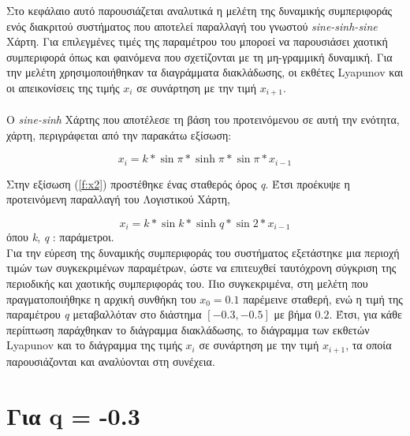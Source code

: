Στο κεφάλαιο αυτό παρουσιάζεται αναλυτικά η μελέτη της δυναμικής συμπεριφοράς ενός διακριτού συστήματος που αποτελεί παραλλαγή του γνωστού \emph{sine-sinh-sine} Χάρτη. Για επιλεγμένες τιμές της παραμέτρου του μποροεί να παρουσιάσει χαοτική συμπεριφορά όπως και φαινόμενα που σχετίζονται με τη μη-γραμμική δυναμική. Για την μελέτη χρησιμοποιήθηκαν τα διαγράμματα διακλάδωσης, οι εκθέτες Lyapunov και οι απεικονίσεις της τιμής \(x_i\) σε συνάρτηση με  την τιμή \(x_{i+1}\).\\\\

Ο \emph{sine-sinh} Χάρτης που αποτέλεσε τη βάση του προτεινόμενου σε αυτή την ενότητα, χάρτη, περιγράφεται από την παρακάτω εξίσωση:

\begin{equation}
	x_i=k*\sin{\pi*\sinh{\pi*\sin{\pi* x_{i-1}}}}
	\label{f:x2}
\end{equation}


Στην εξίσωση (\ref{f:x2}) προστέθηκε ένας σταθερός όρος \emph{q}. Έτσι προέκυψε η προτεινόμενη παραλλαγή του Λογιστικού Χάρτη,

\begin{equation}
	x_i=k*\sin{k*\sinh{q*\sin{2 * x_{i-1}}}}
	\label{f:x3}
\end{equation}
όπου \emph{k}, \emph{q} : παράμετροι.\\

Για την εύρεση της δυναμικής συμπεριφοράς του συστήματος εξετάστηκε μια περιοχή τιμών των συγκεκριμένων παραμέτρων, ώστε να επιτευχθεί ταυτόχρονη σύγκριση της περιοδικής και χαοτικής συμπεριφοράς του. Πιο συγκεκριμένα, στη μελέτη που πραγματοποιήθηκε η αρχική συνθήκη του $x_0 =0.1$ παρέμεινε  σταθερή, ενώ η τιμή της παραμέτρου \emph{q} μεταβαλλόταν στο διάστημα $[-0.3,-0.5]$ με βήμα $0.2$. Έτσι, για κάθε περίπτωση παράχθηκαν το διάγραμμα διακλάδωσης, το διάγραμμα των εκθετών Lyapunov και το διάγραμμα της τιμής \(x_i\) σε συνάρτηση με  την τιμή \(x_{i+1}\), τα οποία παρουσιάζονται και αναλύονται στη συνέχεια.\\




\section{Για q = -0.3}



